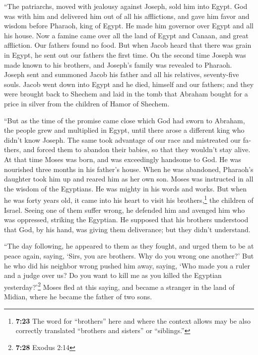 \begin{paracol}{2}
\begin{otherlanguage}{english}
 ``The patriarchs, moved with jealousy against Joseph,
sold him into Egypt. God was with him  and delivered him
out of all his afflictions, and gave him favor and wisdom before
Pharaoh, king of Egypt. He made him governor over Egypt and all his
house.  Now a famine came over all the land of Egypt and
Canaan, and great affliction. Our fathers found no food. 
But when Jacob heard that there was grain in Egypt, he sent out our
fathers the first time.  On the second time Joseph was
made known to his brothers, and Joseph's family was revealed to Pharaoh.
 Joseph sent and summoned Jacob his father and all his
relatives, seventy-five souls.  Jacob went down into
Egypt and he died, himself and our fathers;  and they
were brought back to Shechem and laid in the tomb that Abraham bought
for a price in silver from the children of Hamor of Shechem.

 ``But as the time of the promise came close which God
had sworn to Abraham, the people grew and multiplied in Egypt,
 until there arose a different king who didn't know
Joseph.  The same took advantage of our race and
mistreated our fathers, and forced them to abandon their babies, so that
they wouldn't stay alive.  At that time Moses was born,
and was exceedingly handsome to God. He was nourished three months in
his father's house.  When he was abandoned, Pharaoh's
daughter took him up and reared him as her own son. 
Moses was instructed in all the wisdom of the Egyptians. He was mighty
in his words and works.  But when he was forty years old,
it came into his heart to visit his brothers,\footnote{\textbf{7:23} The
  word for ``brothers'' here and where the context allows may be also
  correctly translated ``brothers and sisters'' or ``siblings.''} the
children of Israel.  Seeing one of them suffer wrong, he
defended him and avenged him who was oppressed, striking the Egyptian.
 He supposed that his brothers understood that God, by
his hand, was giving them deliverance; but they didn't understand.

 ``The day following, he appeared to them as they fought,
and urged them to be at peace again, saying, `Sirs, you are brothers.
Why do you wrong one another?'  But he who did his
neighbor wrong pushed him away, saying, `Who made you a ruler and a
judge over us?  Do you want to kill me as you killed the
Egyptian yesterday?'\footnote{\textbf{7:28} Exodus 2:14} 
Moses fled at this saying, and became a stranger in the land of Midian,
where he became the father of two sons.


\end{otherlanguage}
\end{paracol}
